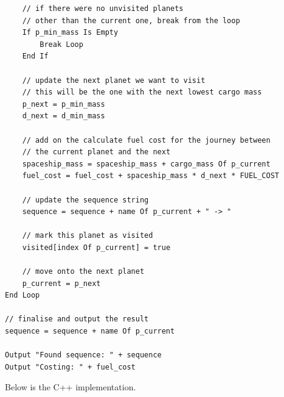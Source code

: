 \documentclass[
]{article}
\begin{document}
\begin{verbatim}
    // if there were no unvisited planets
    // other than the current one, break from the loop
    If p_min_mass Is Empty
        Break Loop
    End If

    // update the next planet we want to visit
    // this will be the one with the next lowest cargo mass
    p_next = p_min_mass
    d_next = d_min_mass

    // add on the calculate fuel cost for the journey between
    // the current planet and the next
    spaceship_mass = spaceship_mass + cargo_mass Of p_current
    fuel_cost = fuel_cost + spaceship_mass * d_next * FUEL_COST

    // update the sequence string
    sequence = sequence + name Of p_current + " -> "

    // mark this planet as visited
    visited[index Of p_current] = true

    // move onto the next planet
    p_current = p_next
End Loop

// finalise and output the result
sequence = sequence + name Of p_current

Output "Found sequence: " + sequence
Output "Costing: " + fuel_cost
\end{verbatim}

Below is the C++ implementation.
\end{document}
